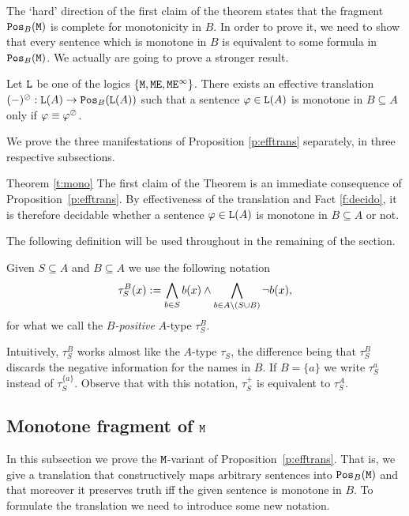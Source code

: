 The `hard' direction of the first claim of the theorem states that the fragment
$\monot{\ofo}{B}$ is complete for monotonicity in $B$. In order to prove it,
we need to show that every sentence which is monotone in $B$ is equivalent to 
some formula in $\monot{\ofo}{B}$. 
We actually are going to prove a stronger result.

\begin{proposition}
\label{p:efftrans}
Let $\llang$ be one of the logics $\{ \ofo, \ofoe, \ofoei \}$.
There exists an effective translation $(-)^\tmono:\llang(A) \to \monot{\llang(A)}{B}$ such that
a sentence ${\phi \in \llang(A)}$ is monotone in $B \subseteq A$ %
only if 
$\phi\equiv \phi^\tmono$.
\end{proposition}

We prove the three manifestations of Proposition \ref{p:efftrans} separately,
in three respective subsections.

\begin{proofof}{Theorem \ref{t:mono}}
The first claim of the Theorem is an immediate consequence of
Proposition~\ref{p:efftrans}.
By effectiveness of the translation and Fact \ref{f:decido}, it is therefore 
decidable whether a sentence $\phi \in \llang(A)$ is monotone in $B \subseteq A$
or not.
\end{proofof}

The following definition will be used throughout in the remaining of the section.

\begin{definition}
Given $S \subseteq A$ and $B \subseteq A$ we use the following notation
\[
\tau^{B}_S(x) \isdef  \bigwedge_{b\in S} b(x) \land 
   \bigwedge_{b\in A\setminus (S\cup B)}\lnot b(x) ,
\]
for what we call the \emph{$B$-positive} $A$-type $\tau^{B}_S$.
\end{definition}

Intuitively, $\tau^{B}_S$ works almost like the $A$-type $\tau_S$, the 
difference being that $\tau^{B}_S$ discards the negative information for the 
names in $B$.
If $B = \{a\}$ we write $\tau^a_S$ instead of $\tau^{\{a\}}_S$. 
Observe that with this notation, $\tau^+_S$ is equivalent to $\tau^A_S$.

\subsection{Monotone fragment of $\ofo$}

In this subsection we prove the $\ofo$-variant of Proposition~\ref{p:efftrans}.
That is, we give a translation that constructively maps arbitrary sentences
into $\monot{\ofo}{B}$ and that moreover it preserves truth iff the given
sentence is monotone in $B$.
To formulate the translation we need to introduce some new notation. 

